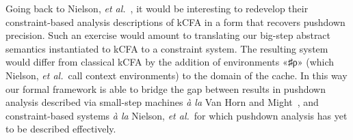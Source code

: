 Going back to Nielson, \emph{et al.}~\cite{dvanhorn:Neilson:1999}, it
would be interesting to redevelop their constraint-based analysis
descriptions of kCFA in a form that recovers pushdown precision. Such
an exercise would amount to translating our big-step abstract
semantics instantiated to kCFA to a constraint system. The resulting
system would differ from classical kCFA by the addition of
environments «♯{ρ}» (which Nielson, \emph{et al.}~call context
environments) to the domain of the cache. In this way our formal
framework is able to bridge the gap between results in pushdown
analysis described via small-step machines \emph{\`a la} Van Horn and
Might~\cite{dvanhorn:VanHorn2010Abstracting}, and constraint-based
systems \emph{\`a la} Nielson, \emph{et al.}~for which pushdown
analysis has yet to be described effectively.
